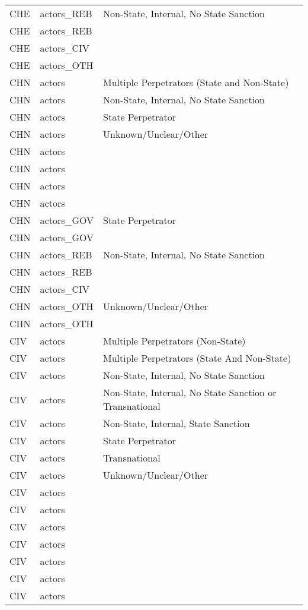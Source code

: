 \begin{table}[ht]
\begin{tabular}{lll}
  CHE & actors\_REB & Non-State, Internal, No State Sanction \\ 
  CHE & actors\_REB &  \\ 
  CHE & actors\_CIV &  \\ 
  CHE & actors\_OTH &  \\ 
  CHN & actors & Multiple Perpetrators (State and Non-State) \\ 
  CHN & actors & Non-State, Internal, No State Sanction \\ 
  CHN & actors & State Perpetrator \\ 
  CHN & actors & Unknown/Unclear/Other \\ 
  CHN & actors &  \\ 
  CHN & actors &  \\ 
  CHN & actors &  \\ 
  CHN & actors &  \\ 
  CHN & actors\_GOV & State Perpetrator \\ 
  CHN & actors\_GOV &  \\ 
  CHN & actors\_REB & Non-State, Internal, No State Sanction \\ 
  CHN & actors\_REB &  \\ 
  CHN & actors\_CIV &  \\ 
  CHN & actors\_OTH & Unknown/Unclear/Other \\ 
  CHN & actors\_OTH &  \\ 
  CIV & actors & Multiple Perpetrators (Non-State) \\ 
  CIV & actors & Multiple Perpetrators (State And Non-State) \\ 
  CIV & actors & Non-State, Internal, No State Sanction \\ 
  CIV & actors & Non-State, Internal, No State Sanction or Transnational \\ 
  CIV & actors & Non-State, Internal, State Sanction \\ 
  CIV & actors & State Perpetrator \\ 
  CIV & actors & Transnational \\ 
  CIV & actors & Unknown/Unclear/Other \\ 
  CIV & actors &  \\ 
  CIV & actors &  \\ 
  CIV & actors &  \\ 
  CIV & actors &  \\ 
  CIV & actors &  \\ 
  CIV & actors &  \\ 
  CIV & actors &  \\ 

\end{tabular}
\end{table}
